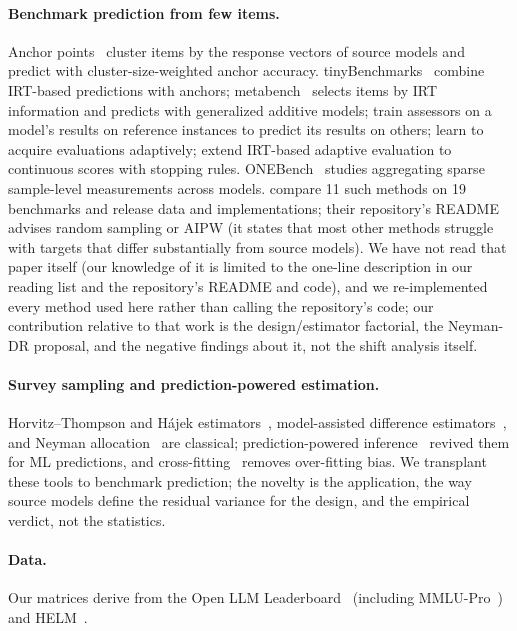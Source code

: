 \documentclass{article}
\begin{document}
\paragraph{Benchmark prediction from few items.}
Anchor points~\citep{vivek2024anchor} cluster items by the response vectors of source models and predict with cluster-size-weighted anchor accuracy.
tinyBenchmarks~\citep{polo2024tiny} combine IRT-based predictions with anchors; metabench~\citep{kipnis2025metabench} selects items by IRT information and predicts with generalized additive models; \citet{pacchiardi2024100} train assessors on a model's results on reference instances to predict its results on others; \citet{li2025active} learn to acquire evaluations adaptively; \citet{balkir2026adaptive} extend IRT-based adaptive evaluation to continuous scores with stopping rules.
ONEBench~\citep{ghosh2024onebench} studies aggregating sparse sample-level measurements across models.
\citet{zhang2025benchmark} compare 11 such methods on 19 benchmarks and release data and implementations; their repository's README advises random sampling or AIPW (it states that most other methods struggle with targets that differ substantially from source models).
We have not read that paper itself (our knowledge of it is limited to the one-line description in our reading list and the repository's README and code), and we re-implemented every method used here rather than calling the repository's code; our contribution relative to that work is the design/estimator factorial, the Neyman-DR proposal, and the negative findings about it, not the shift analysis itself.
\paragraph{Survey sampling and prediction-powered estimation.}
Horvitz--Thompson and H\'ajek estimators~\citep{horvitz1952generalization}, model-assisted difference estimators~\citep{sarndal1992model}, and Neyman allocation~\citep{neyman1934two} are classical; prediction-powered inference~\citep{angelopoulos2023ppi} revived them for ML predictions, and cross-fitting~\citep{chernozhukov2018double} removes over-fitting bias.
We transplant these tools to benchmark prediction; the novelty is the application, the way source models define the residual variance for the design, and the empirical verdict, not the statistics.
\paragraph{Data.}
Our matrices derive from the Open LLM Leaderboard~\citep{fourrier2024openllm} (including MMLU-Pro~\citep{wang2024mmlupro}) and HELM~\citep{liang2023helm}.
\end{document}
